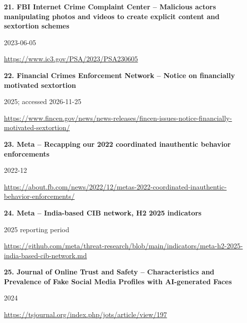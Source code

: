 \documentclass[11pt,a4paper]{article}
\begin{document}
\noindent\begin{minipage}{\linewidth}\textbf{21. FBI Internet Crime Complaint Center -- Malicious actors manipulating photos and videos to create explicit content and sextortion schemes}\par{\small 2023-06-05\par\url{https://www.ic3.gov/PSA/2023/PSA230605}}\par
\end{minipage}\par\vspace{2mm}
\noindent\begin{minipage}{\linewidth}\textbf{22. Financial Crimes Enforcement Network -- Notice on financially motivated sextortion}\par{\small 2025; accessed 2026-11-25\par\url{https://www.fincen.gov/news/news-releases/fincen-issues-notice-financially-motivated-sextortion/}}\par
\end{minipage}\par\vspace{2mm}
\noindent\begin{minipage}{\linewidth}\textbf{23. Meta -- Recapping our 2022 coordinated inauthentic behavior enforcements}\par{\small 2022-12\par\url{https://about.fb.com/news/2022/12/metas-2022-coordinated-inauthentic-behavior-enforcements/}}\par
\end{minipage}\par\vspace{2mm}
\noindent\begin{minipage}{\linewidth}\textbf{24. Meta -- India-based CIB network, H2 2025 indicators}\par{\small 2025 reporting period\par\url{https://github.com/meta/threat-research/blob/main/indicators/meta-h2-2025-india-based-cib-network.md}}\par
\end{minipage}\par\vspace{2mm}
\noindent\begin{minipage}{\linewidth}\textbf{25. Journal of Online Trust and Safety -- Characteristics and Prevalence of Fake Social Media Profiles with AI-generated Faces}\par{\small 2024\par\url{https://tsjournal.org/index.php/jots/article/view/197}}\par
\end{minipage}\par\vspace{2mm}
\end{document}
